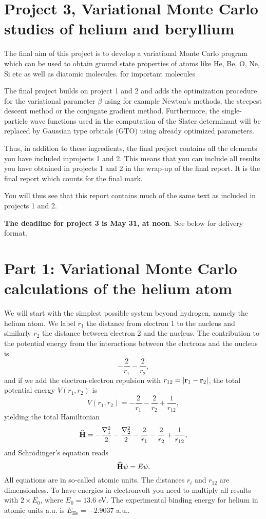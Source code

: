 \documentclass[10pt]{article}
\newcommand{\be}{\begin{equation}}
\newcommand{\ee}{\end{equation}}
\newcommand{\OP}[1]{{\bf\widehat{#1}}}
\begin{document}
\section*{Project 3, Variational Monte Carlo studies of helium and beryllium}

The final aim of this project is to develop a variational Monte Carlo program which can be used to obtain ground state properties of atoms like He, Be, O, Ne, Si etc as well as diatomic molecules. 
for important molecules 

The final project builds on project 1 and 2 and adds the optimization procedure for the variational parameter $\beta$ using for example Newton's methods, the steepest descent method or the conjugate gradient method. 
Furthermore, the single-particle wave functions used in the computation
of the Slater determinant will be replaced by Gaussian type orbitals (GTO) using already optimized parameters. 

Thus, in addition to these ingredients, the final project contains all the elements you have included inprojects 1 and 2. This means that you can include all results you have obtained in projects 1 and 2 in the wrap-up of the final report. It is the final report which counts for the final mark.

You will thus see that this report contains much of the same text as included in projects 1 and 2. 

{\bf The deadline for project 3 is May 31, at noon}.  See below for delivery format.



\section*{Part 1: Variational Monte Carlo calculations of the helium atom}

We will start with the simplest possible system beyond hydrogen, namely the helium atom.
We label $r_1$ the distance from electron 1 to the nucleus and similarly 
$r_2$ the distance between electron 2 and the nucleus.
The contribution to the potential energy from the interactions between the 
electrons and the nucleus is
\be
   -\frac{2}{r_1}-\frac{2}{r_2},
\ee 
and if we add the electron-electron repulsion with
$r_{12}=|{\bf r}_1-{\bf r}_2|$, the total potential energy 
$V(r_1, r_2)$ is
\be
 V(r_1, r_2)=-\frac{2}{r_1}-\frac{2}{r_2}+
               \frac{1}{r_{12}},
\ee
yielding the total Hamiltonian
\be
   \OP{H}=-\frac{\nabla_1^2}{2}-\frac{\nabla_2^2}{2}
          -\frac{2}{r_1}-\frac{2}{r_2}+
               \frac{1}{r_{12}},
\ee
and Schr\"odinger's equation reads
\be
   \OP{H}\psi=E\psi.
\ee
All equations are in so-called atomic units. The distances
$r_i$ and $r_{12}$ are dimensionless. To have energies in electronvolt
you need to multiply all results with 
$2\times E_0$,
where $E_0=13.6$ eV.
The experimental binding energy for helium in atomic units a.u. is $E_{\mathrm{He}}=-2.9037$ a.u..
\end{document}
